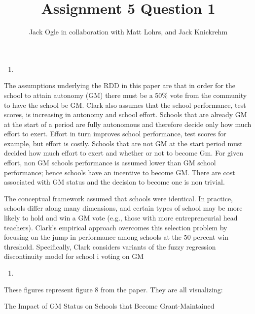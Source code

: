 \documentclass[
  12pt,
  landscape]{article}
\title{Assignment 5 Question 1}
\author{Jack Ogle in collaboration with Matt Lohrs, and Jack Knickrehm}
\date{}
\begin{document}
\maketitle

\begin{enumerate}
\def\labelenumi{(\alph{enumi})}
\item
\end{enumerate}

The assumptions underlying the RDD in this paper are that in order for
the school to attain autonomy (GM) there must be a 50\% vote from the
community to have the school be GM. Clark also assumes that the school
performance, test scores, is increasing in autonomy and school effort.
Schools that are already GM at the start of a period are fully
autonomous and therefore decide only how much effort to exert. Effort in
turn improves school performance, test scores for example, but effort is
costly. Schools that are not GM at the start period must decided how
much effort to exert and whether or not to become Gm. For given effort,
non GM schools performance is assumed lower than GM school performance;
hence schools have an incentive to become GM. There are cost associated
with GM status and the decision to become one is non trivial.

The conceptual framework assumed that schools were identical. In
practice, schools differ along many dimensions, and certain types of
school may be more likely to hold and win a GM vote (e.g., those with
more entrepreneurial head teachers). Clark's empirical approach
overcomes this selection problem by focusing on the jump in performance
among schools at the 50 percent win threshold. Specifically, Clark
considers variants of the fuzzy regression discontinuity model for
school i voting on GM

\begin{enumerate}
\def\labelenumi{(\alph{enumi})}
\setcounter{enumi}{1}
\item
\end{enumerate}

These figures represent figure 8 from the paper. They are all
visualizing:

The Impact of GM Status on Schools that Become Grant-Maintained
\end{document}
